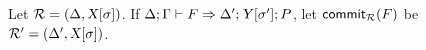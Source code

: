 \documentclass{llncs}
\begin{document}







\begin{definition}
  Let $\mathcal{R} = (\Delta, {\text{\textsl{X}}}[{\sigma}])$.  If ${{\Delta}; {\Gamma}}\vdash{{{F}}\Rightarrow{{\Delta'};{{\ensuremath{\text{\textsl{Y}}}}[{\sigma'}]};{P}}}$, let ${\text{\textsf{commit$_{\mathcal{R}}$}}}({F})$ be
  $\mathcal{R'} = (\Delta', {\text{\textsl{X}}}[{\sigma}])$.
\end{definition}


\end{document}
